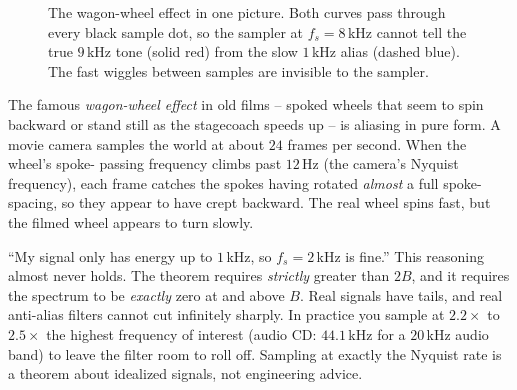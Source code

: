 \begin{figure}[H]
\centering
{}
\caption{The wagon-wheel effect in one picture. Both curves pass through every black
sample dot, so the sampler at $f_s=8$\,kHz cannot tell the true $9$\,kHz tone (solid
red) from the slow $1$\,kHz alias (dashed blue). The fast wiggles between samples are
invisible to the sampler.}
\label{ch18:fig-aliasing-time}
\end{figure}

\begin{happeningbox}
The famous \emph{wagon-wheel effect} in old films -- spoked wheels that seem to spin
backward or stand still as the stagecoach speeds up -- is aliasing in pure form. A
movie camera samples the world at about $24$ frames per second. When the wheel's spoke-
passing frequency climbs past $12$\,Hz (the camera's Nyquist frequency), each frame
catches the spokes having rotated \emph{almost} a full spoke-spacing, so they appear to
have crept backward. The real wheel spins fast, but the filmed wheel appears to turn slowly.
\end{happeningbox}

\begin{trapbox}
``My signal only has energy up to $1$\,kHz, so $f_s = 2$\,kHz is fine.'' This reasoning almost never holds.
The theorem requires \emph{strictly} greater than $2B$, and it requires the spectrum
to be \emph{exactly} zero at and above $B$. Real signals have tails, and real
anti-alias filters cannot cut infinitely sharply. In practice you sample at $2.2\times$
to $2.5\times$ the highest frequency of interest (audio CD: $44.1$\,kHz for a $20$\,kHz
audio band) to leave the filter room to roll off. Sampling at exactly the Nyquist rate
is a theorem about idealized signals, not engineering advice.
\end{trapbox}

